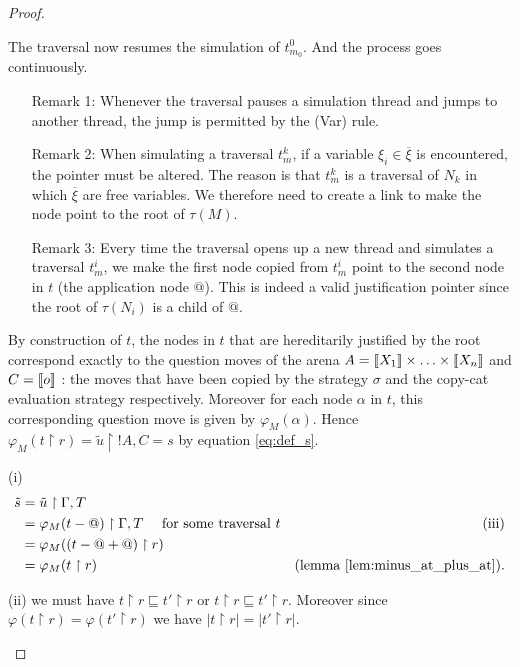 \begin{proof}
\begin{itemize}
    The traversal now resumes the simulation of $t^0_{m_0}$. And the
    process goes continuously.

    \begin{itemize}
    \item[Remark 1:] Whenever the traversal pauses a simulation thread and
    jumps to another thread, the jump
    is permitted by the (Var) rule.

    \item[Remark 2:] When simulating a traversal $t^k_{m}$, if a variable
     $\xi_i \in \overline{\xi}$ is encountered, the pointer must be
     altered. The reason is that $t^k_{m}$ is a traversal of $N_k$ in which $\overline{\xi}$ are free
     variables. We therefore need to create a link to make the node point to the root of $\tau(M)$.

    \item[Remark 3:]Every time the traversal opens up a new thread and simulates a
    traversal $t^i_{m}$, we make the first node copied from $t^i_{m}$ point to the
    second node in $t$ (the application node $@$). This is indeed a valid justification pointer since the root of $\tau(N_i)$ is a child of $@$.
    \end{itemize}


    By construction of  $t$, the nodes in $t$ that are hereditarily justified
    by the root correspond exactly to the question moves of the arena $A = {[\![ X_1 ]\!]} \times \ldots \times {[\![X_n ]\!]}$ and $C = {[\![ o ]\!]}$ :
    the moves that have been copied by the strategy $\sigma$ and the copy-cat evaluation strategy respectively. Moreover for each node $\alpha$ in $t$, this corresponding question move is given by
    $\varphi_M(\alpha)$. Hence $\varphi_M(t \upharpoonright r) = \tilde{u} \upharpoonright !A, C = s$ by equation \ref{eq:def_s}.

(i)
\begin{align*}
\tilde{s} &= \tilde{u} \upharpoonright \Gamma, T \\
&= \varphi_M(t-@) \upharpoonright \Gamma, T  \quad \mbox{ for some traversal $t$}      & \mbox{(iii)}\\
&= \varphi_M((t-@+@)\upharpoonright r) \\
&= \varphi_M(t\upharpoonright r)                   & \mbox{(lemma \ref{lem:minus_at_plus_at}).}
\end{align*}

(ii)
\todo
we must have $t
\upharpoonright r \sqsubseteq t'\upharpoonright r$ or $t
\upharpoonright r \sqsubseteq t'\upharpoonright r$. Moreover since
$\varphi(t \upharpoonright r) = \varphi(t' \upharpoonright r)$ we
have $|t \upharpoonright r|=|t' \upharpoonright r|$.


\end{itemize}
\end{proof}
